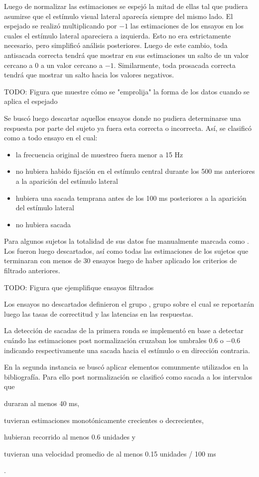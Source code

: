   Luego de normalizar las estimaciones se espejó la mitad de ellas tal que
  pudiera asumirse que el estímulo visual lateral aparecía siempre del mismo
  lado.
  El espejado se realizó multiplicando por $-1$ las estimaciones de los ensayos
  en los cuales el estímulo lateral apareciera a izquierda.
  Esto no era estrictamente necesario, pero simplificó análisis posteriores.
  Luego de este cambio, toda antisacada correcta tendrá que mostrar en sus
  estimaciones un salto de un valor cercano a $0$ a un valor cercano a $-1$.
  Similarmente, toda prosacada correcta tendrá que mostrar un salto hacia los
  valores negativos.

  TODO: Figura que muestre cómo se "emprolija" la forma de los datos cuando se
        aplica el espejado

  Se buscó luego descartar aquellos ensayos donde no pudiera determinarse una
  respuesta por parte del sujeto ya fuera esta correcta o incorrecta.
  Así, se clasificó como \outlier a todo ensayo en el cual:
  \begin{itemize}
    \item la frecuencia original de muestreo fuera menor a 15 Hz
    \item no hubiera habido fijación en el estímulo central durante los 500 ms
      anteriores a la aparición del estímulo lateral
    \item hubiera una sacada temprana antes de los 100 ms posteriores a la
      aparición del estímulo lateral
    \item no hubiera sacada
  \end{itemize}
  Para algunos sujetos la totalidad de sus datos fue manualmente marcada como
  \outlier.
  Los \outliers fueron luego descartados, así como todas las estimaciones de
  los sujetos que terminaran con menos de 30 ensayos luego de haber aplicado
  los criterios de filtrado anteriores.

  TODO: Figura que ejemplifique ensayos filtrados

  Los ensayos no descartados definieron el grupo \inlier, grupo sobre el cual
  se reportarán luego las tasas de correctitud y las latencias en las
  respuestas.

  La detección de sacadas de la primera ronda se implementó en base a detectar
  cuándo las estimaciones post normalización cruzaban los umbrales $0.6$ o
  $-0.6$ indicando respectivamente una sacada hacia el estímulo o en dirección
  contraria.

  En la segunda instancia se buscó aplicar elementos comunmente utilizados en
  la bibliografía.
  Para ello post normalización se clasificó como sacada a los intervalos que
  \begin{enumerate*}
    \item duraran al menos 40 ms,
    \item tuvieran estimaciones monotónicamente crecientes o decrecientes,
    \item hubieran recorrido al menos 0.6 unidades y
    \item tuvieran una velocidad promedio de al menos 0.15 unidades / 100 ms
  \end{enumerate*}.
